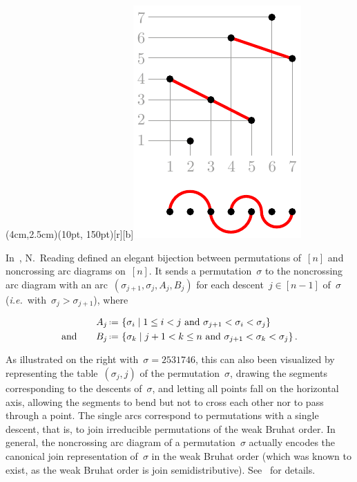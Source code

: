 \documentclass{amsart}
\theoremstyle{definition}
\newcommand{\set}[2]{\left\{ #1 \;\middle|\; #2 \right\}} %
\newcommand{\eqdef}{\mbox{\,\raisebox{0.2ex}{\scriptsize\ensuremath{\mathrm:}}\ensuremath{=}\,}} %
\newcommand{\ie}{\textit{i.e.}~} %
\begin{document}
\vspace{-.1cm}
\parpic(4cm,2.5cm)(10pt, 150pt)[r][b]{\includegraphics[scale=.9]{arcDiagram}}{
In~\cite{Reading-arcDiagrams}, N.~Reading defined an elegant bijection between permutations of~$[n]$ and noncrossing arc diagrams on~$[n]$.
It sends a permutation~$\sigma$ to the noncrossing arc diagram with an arc~$(\sigma_{j+1}, \sigma_j, A_j, B_j)$ for each descent~$j \in [n-1]$ of~$\sigma$ (\ie with~$\sigma_j > \sigma_{j+1}$), where

\vspace{-.2cm}
\begin{minipage}{10cm}
\begin{align*}
A_j & \eqdef \set{\sigma_i}{1 \le i < j \text{ and } \sigma_{j+1} < \sigma_i < \sigma_j} \\
\text{and} \qquad
B_j & \eqdef \set{\sigma_k}{j+1 < k \le n \text{ and } \sigma_{j+1} < \sigma_k < \sigma_j}.
\end{align*}
\end{minipage}

\vspace{.2cm}
\noindent
As illustrated on the right with~$\sigma = 2531746$, this can also been visualized by representing the table~$(\sigma_j,j)$ of the permutation~$\sigma$, drawing the segments corresponding to the descents of~$\sigma$, and letting all points fall on the horizontal axis, allowing the segments to bend but not to cross each other nor to pass through a point.
The single arcs correspond to permutations with a single descent, that is, to join irreducible permutations of the weak Bruhat order.
In general, the noncrossing arc diagram of a permutation~$\sigma$ actually encodes the canonical join representation of~$\sigma$ in the weak Bruhat order (which was known to exist, as the weak Bruhat order is join semidistributive).
See~\cite{Reading-arcDiagrams} for details.
}
\end{document}
